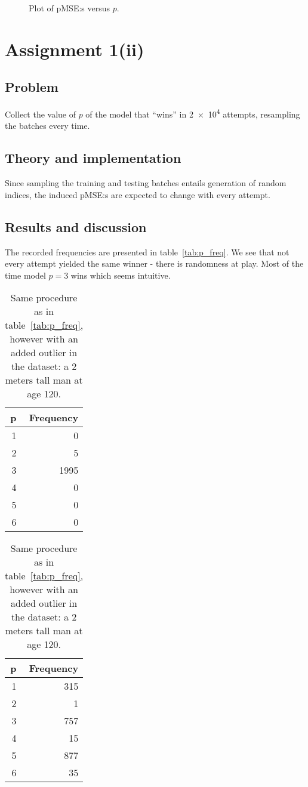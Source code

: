 \documentclass[11pt, a4paper]{article}
\begin{document}
\begin{figure}
	\centering
	
	\caption{Plot of pMSE:s versus $p$. \label{fig:p_pMSE}}
\end{figure}

\section{Assignment 1(ii)}\label{sec:p_freq}
\subsection{Problem}
Collect the value of $p$ of the model that ``wins'' in \num{2e4} attempts,
resampling the batches every time.
\subsection{Theory and implementation}
Since sampling the training and testing batches entails generation of random indices,
the induced pMSE:s are expected to change with every attempt.
\subsection{Results and discussion}
The recorded frequencies are presented in table~\ref{tab:p_freq}.
We see that not every attempt yielded the same winner - there is randomness at play.
Most of the time model $p=3$ wins which seems intuitive. %

\begin{table}
	\parbox{.45\linewidth}{
		\centering
		\caption{Frequencies of ``winning'' models with $p = \text{\numrange{1}{6}}$ across \num{2e4} attemps. \label{tab:p_freq}}
		\begin{tabular}{r@{\hskip 0.5in}r}\toprule
			\centering p & \centering Frequency \tabularnewline \midrule
			1 & 0 \\
			2 & 5 \\
			3 & 1995 \\
			4 & 0 \\
			5 & 0 \\
			6 & 0 \\ \bottomrule
		\end{tabular}
		}
		\hfill
		\parbox{.45\linewidth}{
			\centering
			\caption{Same procedure as in table~\ref{tab:p_freq}, however with an added outlier in the dataset:
			a 2 meters tall man at age 120. \label{tab:p_freq_outlier}}
			\begin{tabular}{r@{\hskip 0.5in}r}\toprule
				\centering p & \centering Frequency \tabularnewline \midrule
				1 & 315 \\
				2 & 1 \\
				3 & 757 \\
				4 & 15 \\
				5 & 877 \\
				6 & 35 \\ \bottomrule
			\end{tabular}
			}
\end{table}
\end{document}
